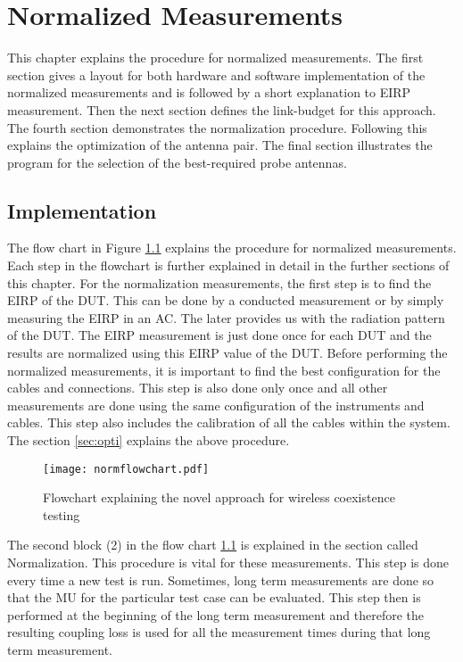 \chapter{Normalized Measurements}\label{chap:normalized}
This chapter explains the procedure for normalized measurements. The first section gives a layout for both hardware and software implementation of the normalized measurements and is followed by a short explanation to \acs{EIRP} measurement. Then the next section defines the link-budget for this approach. The fourth section demonstrates the normalization procedure. Following this explains the optimization of the antenna pair. The final section illustrates the program for the selection of the best-required probe antennas.


\section{Implementation}
The flow chart in Figure \ref{fig:1} explains the procedure for normalized measurements. Each step in the flowchart is further explained in detail in the further sections of this chapter. For the normalization measurements, the first step is to find the \acs{EIRP} of the \acs{DUT}. This can be done by a conducted measurement or by simply measuring the \acs{EIRP} in an \acf{AC}. The later provides us with the radiation pattern of the \acs{DUT}.  The \acs{EIRP} measurement is just done once for each \acs{DUT} and the results are normalized using this \acs{EIRP} value of the \acs{DUT}. Before performing the normalized measurements, it is important to find the best configuration for the cables and connections. This step is also done only once and all other measurements are done using the same configuration of the instruments and cables. This step also includes the calibration of all the cables within the system.  The section \ref{sec:opti} explains the above procedure.

\begin{figure}[H]
\centering
\texttt{[image: normflowchart.pdf]}
\vspace{-2.2cm} \caption{Flowchart explaining the novel approach for wireless coexistence testing}
\label{fig:1} 
\end{figure}

The second block (2) in the flow chart \ref{fig:1} is explained in the section called Normalization. This procedure is vital for these measurements. This step is done every time a new test is run. Sometimes, long term measurements are done so that the \acf{MU} for the particular test case can be evaluated. This step then is performed at the beginning of the long term measurement and therefore the resulting coupling loss is used for all the measurement times during that long term measurement. \\
 
